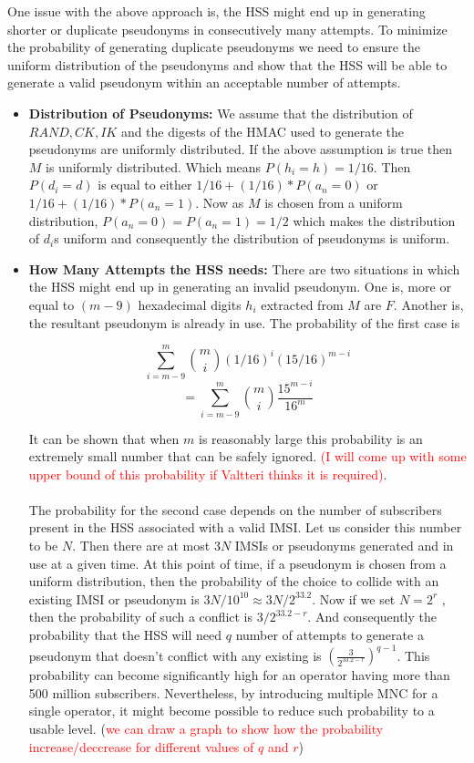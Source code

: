 \documentclass[12pt]{article}
\begin{document}
    One issue with the above approach is, the HSS might end up in generating shorter or duplicate pseudonyms in consecutively many attempts. To minimize the probability of generating duplicate pseudonyms we need to ensure the uniform distribution of the pseudonyms and show that the HSS will be able to generate a valid pseudonym within an acceptable number of attempts.

\begin{itemize}
    \item  \textbf{Distribution of Pseudonyms:} We assume that the distribution of $RAND,CK,IK$ and the digests of the HMAC used to generate the pseudonyms are uniformly distributed. If the above assumption is true then $M$ is uniformly distributed. Which means $P(h_i = h) = 1/16$. Then $P(d_i = d)$ is equal to either  $1/16 + (1/16)*P(a_n=0)$ or $1/16 + (1/16)*P(a_n=1)$. Now as $M$ is chosen from a uniform distribution, $P(a_n=0) = P(a_n=1) = 1/2$ which makes the distribution of $d_i$s uniform and consequently the distribution of pseudonyms is uniform.
    \item \textbf{How Many Attempts the HSS needs:} There are two situations in which the HSS might end up in generating an invalid pseudonym. One is, more or equal to $(m-9)$ hexadecimal digits $h_i$ extracted from $M$ are $F$. Another is, the resultant pseudonym is already in use. The probability of the first case is 
 
        $$\sum\limits_{i=m-9}^{m}\binom{m}{i}(1/16)^i(15/16)^{m-i}$$
        $$=\sum\limits_{i=m-9}^{m}\binom{m}{i}\frac{15^{m-i}}{16^{m}}$$
    
    
    It can be shown that when $m$ is reasonably large this probability is an extremely small number that can be safely ignored. \textcolor{red}{(I will come up with some upper bound of this probability if Valtteri thinks it is required)}. \paragraph{} The probability for the second case depends on the number of subscribers present in the HSS associated with a valid IMSI. Let us consider this number to be $N$. Then there are at most $3N$ IMSIs or pseudonyms generated and in use at a given time. At this point of time, if a pseudonym is chosen from a uniform distribution, then the probability of the choice to collide with an existing IMSI or pseudonym is $3N/10^{10} \approx 3N/2^{33.2}$. Now if we set $N = 2^r$ , then the probability of such a conflict is $3/2^{33.2-r}$. And consequently the probability that the HSS will need $q$ number of attempts to generate a pseudonym that doesn't conflict with any existing is $(\frac{3}{2^{33.2-r}})^{q-1}$. This probability can become significantly high for an operator having more than 500 million subscribers. Nevertheless, by introducing multiple MNC for a single operator, it might become possible to reduce such probability to a usable level.  (\textcolor{red}{we can draw a graph to show how the probability increase/deccrease for different values of $q$ and $r$})
\end{itemize}
\end{document}
